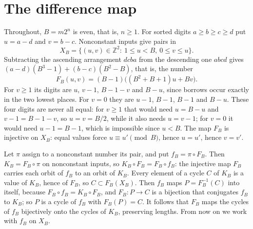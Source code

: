 \documentclass[11pt]{amsart}
\theoremstyle{definition}
\theoremstyle{remark}
\begin{document}
\section{The difference map}\label{sec:map}

Throughout, $B=m2^n$ is even, that is, $n\ge1$.
For sorted digits $a\ge b\ge c\ge d$ put $u=a-d$ and $v=b-c$. Nonconstant inputs give pairs in
\[
X_B=\{(u,v)\in\mathbb Z^2:\ 1\le u<B,\ 0\le v\le u\}.
\]
Subtracting the ascending arrangement $dcba$ from the descending one $abcd$ gives $(a-d)(B^3-1)+(b-c)(B^2-B)$, that is, the number
\[
F_B(u,v)=(B-1)\bigl((B^2+B+1)u+Bv\bigr).
\]
For $v\ge1$ its digits are $u$, $v-1$, $B-1-v$ and $B-u$, since borrows occur exactly in the two lowest places. For $v=0$ they are $u-1$, $B-1$, $B-1$ and $B-u$. These four digits are never all equal: for $v\ge1$ that would need $u=B-u$ and $v-1=B-1-v$, so $u=v=B/2$, while it also needs $u=v-1$; for $v=0$ it would need $u-1=B-1$, which is impossible since $u<B$.
The map $F_B$ is injective on $X_B$: equal values force $u\equiv u'\pmod B$, hence $u=u'$, hence $v=v'$. 

Let $\pi$ assign to a nonconstant number its pair, and put $f_B=\pi\circ F_B$. Then $K_B=F_B\circ\pi$ on nonconstant inputs, so $K_B\circ F_B=F_B\circ f_B$: the injective map $F_B$ carries each orbit of $f_B$ to an orbit of $K_B$. Every element of a cycle $C$ of $K_B$ is a value of $K_B$, hence of $F_B$, so $C\subset F_B(X_B)$. Then $f_B$ maps $P=F_B^{-1}(C)$ into itself, because $F_B\circ f_B=K_B\circ F_B$, and $F_B\colon P\to C$ is a bijection that conjugates $f_B$ to $K_B$; so $P$ is a cycle of $f_B$ with $F_B(P)=C$. It follows that $F_B$ maps the cycles of $f_B$ bijectively onto the cycles of $K_B$, preserving lengths. From now on we work with $f_B$ on $X_B$.
\end{document}
